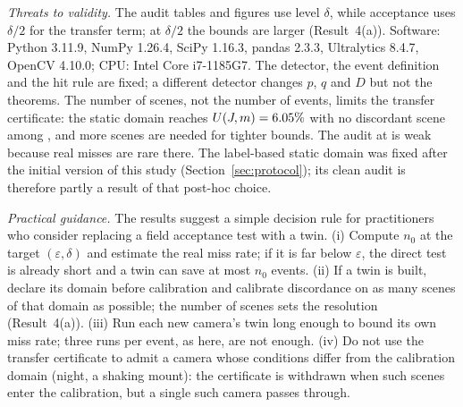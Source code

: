 \emph{Threats to validity.} The audit tables and figures use level $\delta$, while acceptance uses $\delta/2$ for the
transfer term; at $\delta/2$ the bounds are larger (Result~4(a)). Software: Python 3.11.9, NumPy 1.26.4, SciPy 1.16.3,
pandas 2.3.3, Ultralytics 8.4.7, OpenCV 4.10.0; CPU: Intel Core i7-1185G7. The detector, the event definition and the
hit rule are fixed; a different detector changes
$p$, $q$ and $D$ but not the theorems. The number of scenes, not the number of events, limits the transfer certificate:
the static domain reaches $U(J,m)=6.05\%$ with no discordant scene among \nMainM, and more scenes are needed for
tighter bounds. The audit at \OPs{} is weak because real misses are rare there. The label-based static domain was fixed after the initial version of this
study (Section~\ref{sec:protocol}); its clean audit is therefore partly a result of that post-hoc choice.

\emph{Practical guidance.} The results suggest a simple decision rule for practitioners who consider replacing a
field acceptance test with a twin. (i) Compute $n_0$ at the target $(\varepsilon,\delta)$ and estimate the real miss rate;
if it is far below $\varepsilon$, the direct test is already short and a twin can save at most $n_0$ events. (ii) If a
twin is built, declare its domain before calibration and calibrate discordance on as many scenes of that domain as
possible; the number of scenes sets the resolution (Result~4(a)). (iii) Run each new camera's twin long
enough to bound its own miss rate; three runs per event, as here, are not enough. (iv) Do not use the transfer
certificate to admit a camera whose conditions differ from the calibration domain (night, a shaking mount): the
certificate is withdrawn when such scenes enter the calibration, but a single such camera passes through.

